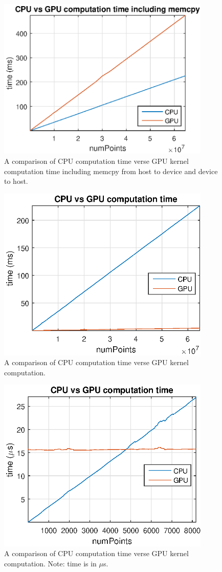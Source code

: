\begin{figure}
	\centering\includegraphics[width=4in]{figures/gpu_intro/CPUvsGPUwithMemcpy.eps}
	\caption{A comparison of CPU computation time verse GPU kernel computation time including memcpy from host to device and device to host.}
	\label{fig:CPUvsGPUwithMemcpy}
\end{figure}
\begin{figure}
	\centering\includegraphics[width=4in]{figures/gpu_intro/CPUvsGPU.eps}
	\caption{A comparison of CPU computation time verse GPU kernel computation.}
	\label{fig:CPUvsGPU}
\end{figure}
\begin{figure}
	\centering\includegraphics[width=4in]{figures/gpu_intro/CPUvsGPUzoomed.eps}
	\caption{A comparison of CPU computation time verse GPU kernel computation. Note: time is in $\mu$s.}
	\label{fig:CPUvsGPUzoomed}
\end{figure}




